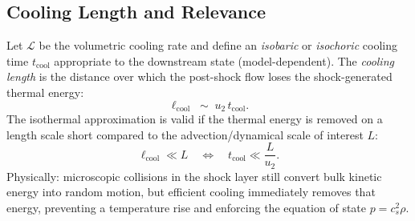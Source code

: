 \subsection*{Cooling Length and Relevance}

Let $\mathcal{L}$ be the volumetric cooling rate and define an \emph{isobaric} or \emph{isochoric} cooling time $t_{\mathrm{cool}}$ appropriate to the downstream state (model-dependent). The \emph{cooling length} is the distance over which the post-shock flow loses the shock-generated thermal energy:
\begin{equation}
\ell_{\mathrm{cool}} \;\sim\; u_2\, t_{\mathrm{cool}}.
\end{equation}
The isothermal approximation is valid if the thermal energy is removed on a length scale short compared to the advection/dynamical scale of interest $L$:
\[
\ell_{\mathrm{cool}} \ll L
\quad\Longleftrightarrow\quad
t_{\mathrm{cool}} \ll \frac{L}{u_2}.
\]
Physically: microscopic collisions in the shock layer still convert bulk kinetic energy into random motion, but efficient cooling immediately removes that energy, preventing a temperature rise and enforcing the equation of state $p=c_s^2\rho$.


